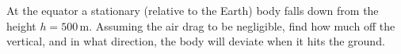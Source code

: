 \item At the equator a stationary (relative to the Earth) body falls down from the height \( h = 500 \, \text{m} \). Assuming the air drag to be negligible, find how much off the vertical, and in what direction, the body will deviate when it hits the ground.